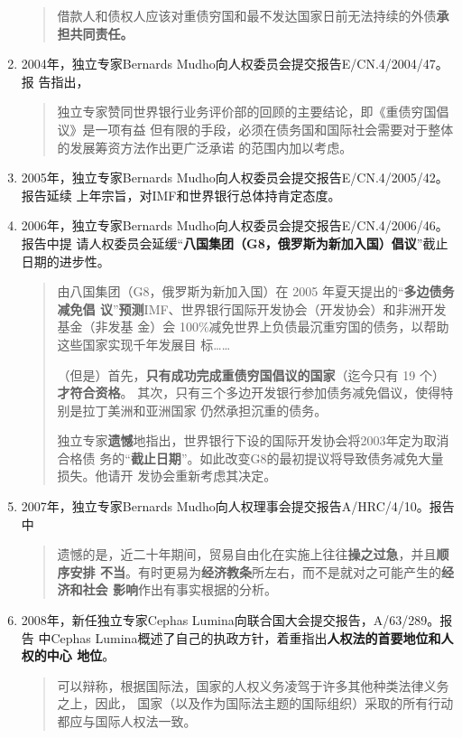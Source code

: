 \begin{enumerate}
\begin{quotation}
    借款人和债权人应该对重债穷国和最不发达国家日前无法持续的外债\textbf{承担共同责任。}
  \end{quotation}

\item 2004年，独立专家Bernards Mudho向人权委员会提交报告E/CN.4/2004/47。报
  告指出，
  \begin{quotation}
    独立专家赞同世界银行业务评价部的回顾的主要结论，即《重债穷国倡议》是一项有益
    但有限的手段，必须在债务国和国际社会需要对于整体的发展筹资方法作出更广泛承诺
    的范围内加以考虑。
  \end{quotation}

\item 2005年，独立专家Bernards Mudho向人权委员会提交报告E/CN.4/2005/42。报告延续
  上年宗旨，对IMF和世界银行总体持肯定态度。

\item 2006年，独立专家Bernards Mudho向人权委员会提交报告E/CN.4/2006/46。报告中提
  请人权委员会延缓“\textbf{八国集团（G8，俄罗斯为新加入国）倡议}”截止日期的进步性。
  \begin{quotation}
    由八国集团（G8，俄罗斯为新加入国）在 2005 年夏天提出的“\textbf{多边债务减免倡
      议}”\textbf{预测}IMF、世界银行国际开发协会（开发协会）和非洲开发基金（非发基
    金）会 100\%减免世界上负债最沉重穷国的债务，以帮助这些国家实现千年发展目
    标……

    （但是）首先，\textbf{只有成功完成重债穷国倡议的国家}（迄今只有 19 个）\textbf{才符合资格}。
    其次，只有三个多边开发银行参加债务减免倡议，使得特别是拉丁美洲和亚洲国家
    仍然承担沉重的债务。

    独立专家\textbf{遗憾}地指出，世界银行下设的国际开发协会将2003年定为取消合格债
    务的“\textbf{截止日期}”。如此改变G8的最初提议将导致债务减免大量损失。他请开
    发协会重新考虑其决定。
  \end{quotation}

\item 2007年，独立专家Bernards Mudho向人权理事会提交报告A/HRC/4/10。报告中
  \begin{quotation}
    遗憾的是，近二十年期间，贸易自由化在实施上往往\textbf{操之过急}，并且\textbf{顺序安排
      不当}。有时更易为\textbf{经济教条}所左右，而不是就对之可能产生的\textbf{经济和社会
      影响}作出有事实根据的分析。
  \end{quotation}


\item 2008年，新任独立专家Cephas Lumina向联合国大会提交报告，A/63/289。报告
  中Cephas Lumina概述了自己的执政方针，着重指出\textbf{人权法的首要地位和人权的中心
    地位}。
  \begin{quotation}
    可以辩称，根据国际法，国家的人权义务凌驾于许多其他种类法律义务之上，因此，
    国家（以及作为国际法主题的国际组织）采取的所有行动都应与国际人权法一致。
  \end{quotation}


\end{enumerate}
